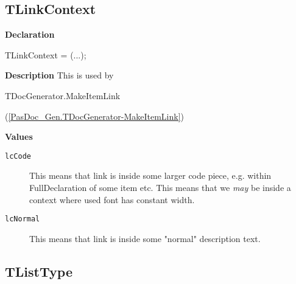 \documentclass{report}
\newif\ifpdf
\begin{document}
\subsection*{TLinkContext}
\fi
\label{PasDoc_Gen-TLinkContext}
\begin{list}{}{
\setlength{\itemindent}{0cm}
\setlength{\listparindent}{0cm}
\setlength{\leftmargin}{\evensidemargin}
\addtolength{\leftmargin}{\tmplength}
\settowidth{\labelsep}{X}
\addtolength{\leftmargin}{\labelsep}
\setlength{\labelwidth}{\tmplength}
}
\item[\textbf{Declaration}\hfill]
\ifpdf
\begin{flushleft}
\fi
\begin{ttfamily}
TLinkContext = (...);\end{ttfamily}

\ifpdf
\end{flushleft}
\fi

\par
\item[\textbf{Description}]
This is used by \begin{ttfamily}TDocGenerator.MakeItemLink\end{ttfamily}(\ref{PasDoc_Gen.TDocGenerator-MakeItemLink})\item[\textbf{Values}]
\begin{description}
\item[\texttt{lcCode}] \label{PasDoc_Gen-lcCode}
\index{}
This means that link is inside some larger code piece, e.g. within FullDeclaration of some item etc. This means that we \textit{may} be inside a context where used font has constant width.
\item[\texttt{lcNormal}] \label{PasDoc_Gen-lcNormal}
\index{}
This means that link is inside some "normal" description text.
\end{description}


\end{list}
\ifpdf
\subsection*{\large{\textbf{TListType}}\normalsize\hspace{1ex}\hrulefill}
\else
\end{document}

